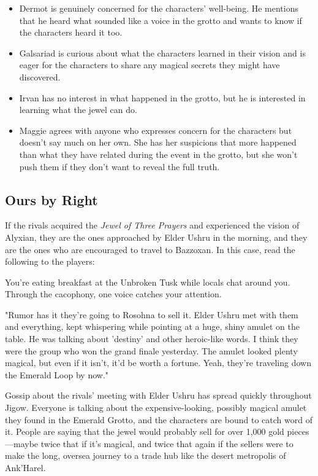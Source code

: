 \documentclass[10pt,a4paper,twoside,bg=print,twocolumn,openany,nodeprecatedcode]{dndbook}
\begin{document}
\begin{itemize}
\item Dermot is genuinely concerned for the characters' well-being. He mentions that he heard what sounded like a voice in the grotto and wants to know if the characters heard it too.
\item Galsariad is curious about what the characters learned in their vision and is eager for the characters to share any magical secrets they might have discovered.
\item Irvan has no interest in what happened in the grotto, but he is interested in learning what the jewel can do.
\item Maggie agrees with anyone who expresses concern for the characters but doesn't say much on her own. She has her suspicions that more happened than what they have related during the event in the grotto, but she won't push them if they don't want to reveal the full truth.
\end{itemize}

\subsection{Ours by Right}
If the rivals acquired the \textit{Jewel of Three Prayers} and experienced the vision of Alyxian, they are the ones approached by Elder Ushru in the morning, and they are the ones who are encouraged to travel to Bazzoxan. In this case, read the following to the players:

\begin{DndReadAloud}{}
You're eating breakfast at the Unbroken Tusk while locals chat around you. Through the cacophony, one voice catches your attention.

"Rumor has it they're going to Rosohna to sell it. Elder Ushru met with them and everything, kept whispering while pointing at a huge, shiny amulet on the table. He was talking about 'destiny' and other heroic-like words. I think they were the group who won the grand finale yesterday. The amulet looked plenty magical, but even if it isn't, it'd be worth a fortune. Yeah, they're traveling down the Emerald Loop by now."

\end{DndReadAloud}

Gossip about the rivals' meeting with Elder Ushru has spread quickly throughout Jigow. Everyone is talking about the expensive-looking, possibly magical amulet they found in the Emerald Grotto, and the characters are bound to catch word of it. People are saying that the jewel would probably sell for over 1,000 gold pieces—maybe twice that if it's magical, and twice that again if the sellers were to make the long, oversea journey to a trade hub like the desert metropolis of Ank'Harel.
\end{document}
